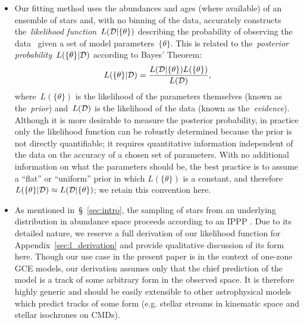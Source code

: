 \documentclass[ms.tex]{subfiles}
\begin{document}
\begin{itemize}

	\item Our fitting method uses the abundances and ages (where available) of
	an ensemble of stars and, with no binning of the data, accurately
	constructs the~\textit{likelihood function}~$L(\mathcal{D} | \{\theta\})$
	describing the probability of observing the data~ given a set of
	model parameters~$\{\theta\}$.
	This is related to the~\textit{posterior probability}~$L(\{\theta\} |
	\mathcal{D})$ according to Bayes' Theorem:
	\begin{equation}
	L(\{\theta\} | \mathcal{D}) = \frac{
		L(\mathcal{D} | \{\theta\}) L(\{\theta\})
	}{
		L(\mathcal{D})
	},
	\end{equation}
	where~$L(\{\theta\})$ is the likelihood of the parameters themselves
	(known as the~\textit{prior}) and~$L(\mathcal{D})$ is the likelihood of the
	data (known as the~\textit{evidence}).
	Although it is more desirable to measure the posterior probability,
	in practice only the likelihood function can be robustly determined
	because the prior is not directly quantifiable; it requires quantitative
	information independent of the data on the accuracy of a chosen set of
	parameters.
	With no additional information on what the parameters should be, the best
	practice is to assume a ``flat'' or ``uniform'' prior in which
	$L(\{\theta\})$ is a constant, and therefore
	$L(\{\theta\} | \mathcal{D}) \approx L(\mathcal{D} | \{\theta\})$; we retain
	this convention here.

	\item As mentioned in~\S~\ref{sec:intro}, the sampling of stars from an
	underlying distribution in abundance space proceeds according to an IPPP
	\citep[e.g.][]{Press2007}.
	Due to its detailed nature, we reserve a full derivation of our likelihood
	function for Appendix~\ref{sec:l_derivation} and provide qualitative
	discussion of its form here.
	Though our use case in the present paper is in the context of one-zone GCE
	models, our derivation assumes only that the chief prediction of the model
	is a track of some arbitrary form in the observed space.
	It is therefore highly generic and should be easily extensible to other
	astrophysical models which predict tracks of some form (e.g. stellar
	streams in kinematic space and stellar isochrones on CMDs).


\end{itemize}
\end{document}
